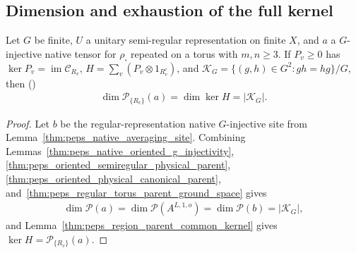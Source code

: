 \subsection{Dimension and exhaustion of the full kernel}

\begin{lemma}%
    \label{thm:peps_native_uniform_semiregular_parent_dimension}
    \leanok
    Let $G$ be finite, $U$ a unitary semi-regular representation on finite $X$,
    and $a$ a $G$-injective native tensor for $\rho_\square$ repeated on a torus
    with $m,n\ge3$. If $P_v\ge0$ has $\ker P_v=\operatorname{im}\mathcal C_{R_v}$,
    $H=\sum_v(P_v\otimes1_{R_v^c})$, and $\mathcal K_G=\{(g,h)\in G^2:gh=hg\}/G$,
    then (\cite[Theorem~5.9]{Schuch2010PEPS})
    \begin{align}
        \dim\mathcal P_{\{R_v\}}(a)=\dim\ker H=|\mathcal K_G|.
        \label{eq:peps_native_semiregular_dimension}
    \end{align}
\end{lemma}
\begin{proof}\leanok
    Let $b$ be the regular-representation native $G$-injective site from
    Lemma~\ref{thm:peps_native_averaging_site}. Combining
    Lemmas~\ref{thm:peps_native_oriented_g_injectivity},
    \ref{thm:peps_oriented_semiregular_physical_parent},
    \ref{thm:peps_oriented_physical_canonical_parent},
    and~\ref{thm:peps_regular_torus_parent_ground_space} gives
    \begin{align}
        \dim\mathcal P(a)
        =\dim\mathcal P(A^{L,1,o})
        =\dim\mathcal P(b)=|\mathcal K_G|,
        \label{eq:peps_native_dimension_comparison}
    \end{align}
    and Lemma~\ref{thm:peps_region_parent_common_kernel} gives
    $\ker H=\mathcal P_{\{R_v\}}(a)$.
\end{proof}

